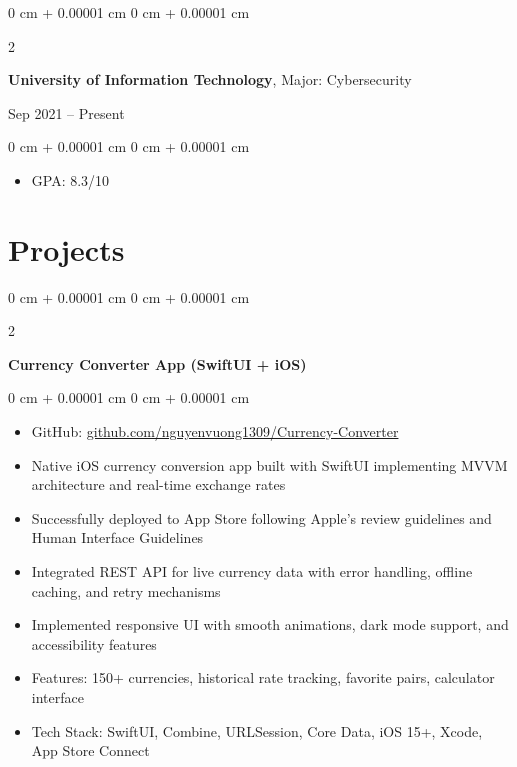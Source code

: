 \documentclass[10pt, letterpaper]{article}
\newenvironment{highlights}{
    \begin{itemize}[
        topsep=0.10 cm,
        parsep=0.10 cm,
        partopsep=0pt,
        itemsep=0pt,
        leftmargin=0 cm + 10pt
    ]
}{
    \end{itemize}
} %
\newenvironment{onecolentry}{
    \begin{adjustwidth}{
        0 cm + 0.00001 cm
    }{
        0 cm + 0.00001 cm
    }
}{
    \end{adjustwidth}
} %
\newenvironment{twocolentry}[2][]{
    \onecolentry
    \def\secondColumn{#2}
    \setcolumnwidth{\fill, 4.5 cm}
    \begin{paracol}{2}
}{
    \switchcolumn \raggedleft \secondColumn
    \end{paracol}
    \endonecolentry
} %
\begin{document}
        \begin{twocolentry}{
            Sep 2021 – Present
        }
            \textbf{University of Information Technology}, Major: Cybersecurity
        \end{twocolentry}

        \vspace{0.15 cm}
        \begin{onecolentry}
            \begin{highlights}
                \item GPA: 8.3/10
            \end{highlights}
        \end{onecolentry}


    \section{Projects}

        \begin{twocolentry}{
            2024
        }
            \textbf{Currency Converter App (SwiftUI + iOS)}
        \end{twocolentry}

        \vspace{0.15 cm}
        \begin{onecolentry}
            \begin{highlights}
                \item GitHub: \href{https://github.com/nguyenvuong1309/Currency-Converter}{github.com/nguyenvuong1309/Currency-Converter}
                \item Native iOS currency conversion app built with SwiftUI implementing MVVM architecture and real-time exchange rates
                \item Successfully deployed to App Store following Apple's review guidelines and Human Interface Guidelines
                \item Integrated REST API for live currency data with error handling, offline caching, and retry mechanisms
                \item Implemented responsive UI with smooth animations, dark mode support, and accessibility features
                \item Features: 150+ currencies, historical rate tracking, favorite pairs, calculator interface
                \item Tech Stack: SwiftUI, Combine, URLSession, Core Data, iOS 15+, Xcode, App Store Connect
            \end{highlights}
        \end{onecolentry}
\end{document}

